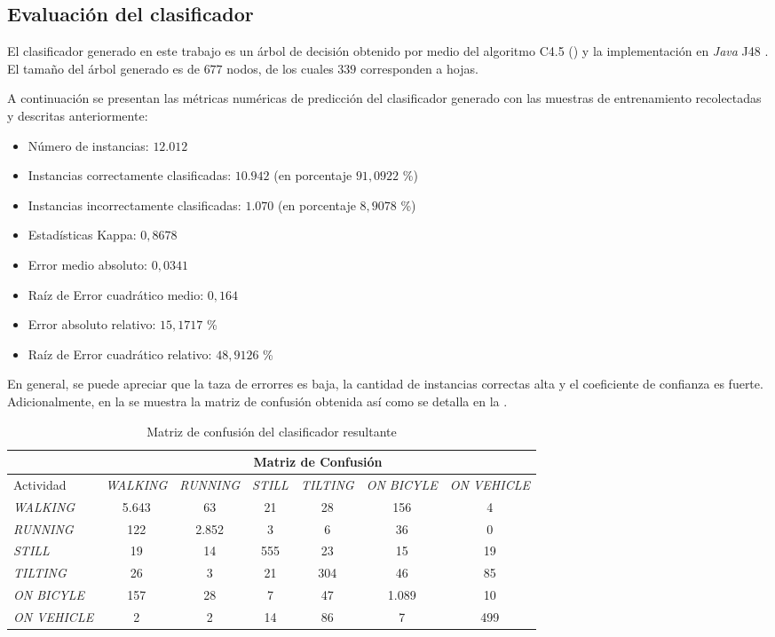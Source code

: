\subsection{Evaluación del clasificador}

El clasificador generado en este trabajo es un árbol de decisión obtenido
por medio del algoritmo C4.5 () y la implementación
en \emph{Java} J48 \cite{Frank2016b}. El tamaño del árbol generado
es de $677$ nodos, de los cuales $339$ corresponden a hojas.

A continuación se presentan las métricas numéricas de predicción del
clasificador generado con las muestras de entrenamiento recolectadas
y descritas anteriormente: 
\begin{itemize}
\item Número de instancias: $12.012$ 
\item Instancias correctamente clasificadas: $10.942$ (en porcentaje $91,0922$
\%)
\item Instancias incorrectamente clasificadas: $1.070$ (en porcentaje $8,9078$
\%)
\item Estadísticas Kappa: $0,8678$ 
\item Error medio absoluto: $0,0341$
\item Raíz de Error cuadrático medio: $0,164$ 
\item Error absoluto relativo: $15,1717$ \% 
\item Raíz de Error cuadrático relativo: $48,9126$ \% 
\end{itemize}
En general, se puede apreciar que la taza de errorres es baja, la
cantidad de instancias correctas alta y el coeficiente de confianza
es fuerte. Adicionalmente, en la  se
muestra la matriz de confusión obtenida así como se detalla en la
. 

\begin{table}[h]
\begin{centering}
\begin{tabular}{|l|c|c|c|c|c|c|}
\cline{2-7} 
\multicolumn{1}{l|}{} & \multicolumn{6}{c|}{Matriz de Confusión}\tabularnewline
\hline 
Actividad & \emph{\footnotesize{}WALKING} & \emph{\footnotesize{}RUNNING} & \emph{\footnotesize{}STILL} & \emph{\footnotesize{}TILTING} & \emph{\footnotesize{}ON BICYLE} & \emph{\footnotesize{}ON VEHICLE}\tabularnewline
\hline 
\hline 
\emph{\footnotesize{}WALKING} & 5.643 & 63 & 21 & 28 & 156 & 4\tabularnewline
\hline 
\emph{\footnotesize{}RUNNING} & 122 & 2.852 & 3 & 6 & 36 & 0\tabularnewline
\hline 
\emph{\footnotesize{}STILL} & 19 & 14 & 555 & 23 & 15 & 19\tabularnewline
\hline 
\emph{\footnotesize{}TILTING} & 26 & 3 & 21 & 304 & 46 & 85\tabularnewline
\hline 
\emph{\footnotesize{}ON BICYLE} & 157 & 28 & 7 & 47 & 1.089 & 10\tabularnewline
\hline 
\emph{\footnotesize{}ON VEHICLE} & 2 & 2 & 14 & 86 & 7 & 499\tabularnewline
\hline 
\end{tabular}
\par\end{centering}
\caption{\label{tab6:matriz-confusion}Matriz de confusión del clasificador
resultante}
\end{table}


